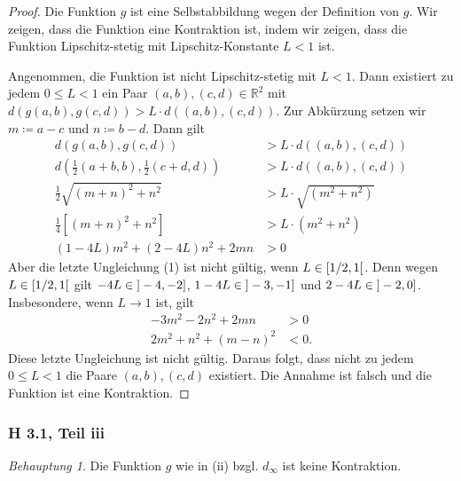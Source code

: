 \documentclass[draft,a5paper]{article}
\theoremstyle{remark}
\newtheorem*{beh}{Behauptung}
\newcommand{\interval}[1]{\mathinner{#1}}
\begin{document}
\begin{proof}
  Die Funktion \(g\) ist eine Selbstabbildung wegen der Definition von
  \(g\).  Wir zeigen, dass die Funktion eine Kontraktion ist, indem
  wir zeigen, dass die Funktion Lipschitz-stetig mit
  Lipschitz-Konstante \(L < 1\) ist.

  Angenommen, die Funktion ist nicht Lipschitz-stetig mit \(L < 1\).
  Dann existiert zu jedem \(0 \le L < 1\) ein Paar \((a, b), (c, d) \in
  \mathbb{R}^{2}\) mit \(d(g(a, b), g(c, d)) > L \cdot d((a, b), (c, d))\).  Zur
  Abkürzung setzen wir \(m \coloneq a - c\) und \(n \coloneq b - d\).  Dann gilt
  \begin{align*}
    d(g(a, b), g(c, d))
    &> L \cdot d((a, b), (c, d)) \\
    d\left(\frac{1}{2}(a+b, b), \frac{1}{2}(c+d, d)\right)
    &> L \cdot d((a,b), (c, d)) \\
    \frac{1}{2} \sqrt{(m+n)^{2} + n^{2}} &> L \cdot \sqrt{(m^{2} + n^{2})} \\
    \frac{1}{4} [(m + n)^{2} + n^{2}]
    &> L \cdot (m^{2} + n^{2}) \\
    (1 - 4L)m^{2} + (2 - 4L)n^{2} + 2mn
    &> 0 \tag{1}
  \end{align*}
  Aber die letzte Ungleichung (1) ist nicht gültig, wenn \(L \in
  \interval{[1/2, 1[}\). Denn wegen \(L \in \interval{[1/2, 1[}\) gilt
  \(-4L \in \interval{]-4, -2]}\), \(1-4L \in \interval{]-3, -1]}\) und
  \(2-4L \in \interval{]-2, 0]}\).  Insbesondere, wenn \(L \to 1\) ist,
  gilt
  \begin{align*}
    -3m^{2} - 2n^{2} + 2mn &> 0 \\
    2m^{2} + n^{2} + (m-n)^{2} &< 0.
  \end{align*}
  Diese letzte Ungleichung ist nicht gültig.  Daraus folgt, dass nicht
  zu jedem \(0 \le L < 1\) die Paare \((a,b), (c,d)\) existiert. Die
  Annahme ist falsch und die Funktion ist eine Kontraktion.
\end{proof}

\subsubsection*{H 3.1, Teil iii}

\begin{beh}
  Die Funktion \(g\) wie in (ii) bzgl. \(d_{\infty}\) ist keine Kontraktion.
\end{beh}
\end{document}
